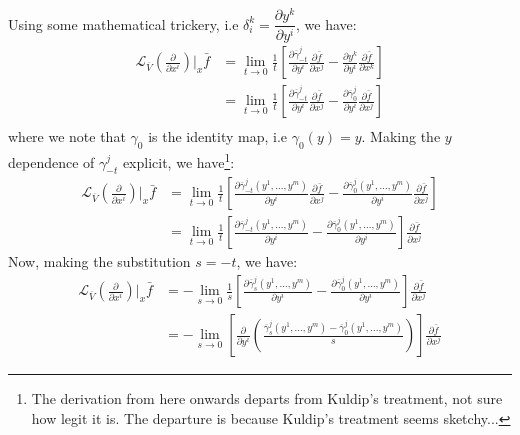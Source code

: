         Using some mathematical trickery, i.e $\delta_i^k = \dfrac{\partial
        y^k}{\partial y^i}$, we have:
        \begin{align*}
          \mathcal{L}_{\overline{V}}\left(\frac{\partial}{\partial
          x^i}\right)\Bigr|_x \bar{f}
          &= \lim_{t \to 0}\frac{1}{t}\left[\frac{\partial
          \overline{\gamma}_{-t}^j}{\partial y^i}\frac{\partial
          \bar{f}}{\partial x^j} - \frac{\partial y^k}{\partial
          y^i}\frac{\partial \bar{f}}{\partial x^k} \right]\\
          &= \lim_{t \to 0}\frac{1}{t}\left[\frac{\partial
          \overline{\gamma}_{-t}^j}{\partial y^i}\frac{\partial
          \bar{f}}{\partial x^j} - \frac{\partial
          \overline{\gamma}^j_{0}}{\partial y^i}\frac{\partial
          \bar{f}}{\partial x^j} \right] \\
        \end{align*}
        where we note that $\gamma_0$ is the identity map, i.e $\gamma_0(y) =
        y$. Making the $y$ dependence of $\gamma_{-t}^j$ explicit, we
        have\footnote{The derivation from here onwards departs from Kuldip's
        treatment, not sure how legit it is. The departure is because
        Kuldip's treatment seems sketchy...}:
        \begin{align*}
          \mathcal{L}_{\overline{V}}\left(\frac{\partial}{\partial
          x^i}\right)\Bigr|_x \bar{f}
          &= \lim_{t \to 0}\frac{1}{t}\left[\frac{\partial
          \overline{\gamma}_{-t}^j(y^1,...,y^m)}{\partial
          y^i}\frac{\partial \bar{f}}{\partial x^j} -
          \frac{\partial
          \overline{\gamma}^j_{0}(y^1,...,y^m)}{\partial
          y^i}\frac{\partial \bar{f}}{\partial x^j} \right] \\
          &= \lim_{t \to 0}\frac{1}{t}\left[\frac{\partial
          \overline{\gamma}_{-t}^j(y^1,...,y^m)}{\partial y^i} -
          \frac{\partial \overline{\gamma}^j_{0}(y^1,...,y^m)}{\partial y^i}
          \right]\frac{\partial \bar{f}}{\partial x^j}
        \end{align*}
        Now, making the substitution $s = -t$, we have:
        \begin{align*}
          \mathcal{L}_{\overline{V}}\left(\frac{\partial}{\partial
          x^i}\right)\Bigr|_x \bar{f}
          &= -\lim_{s \to 0}\frac{1}{s}\left[\frac{\partial
          \overline{\gamma}_{s}^j(y^1,...,y^m)}{\partial y^i} -
          \frac{\partial \overline{\gamma}^j_{0}(y^1,...,y^m)}{\partial
          y^i}\right] \frac{\partial \bar{f}}{\partial x^j} \\
          &= -\lim_{s \to 0}\left[\frac{\partial}{\partial
          y^i}\left(\frac{\overline{\gamma}_{s}^j(y^1,...,y^m) -
          \overline{\gamma}_{0}^j(y^1,...,y^m)}{s}\right)
          \right]\frac{\partial \bar{f}}{\partial x^j}
        \end{align*}
